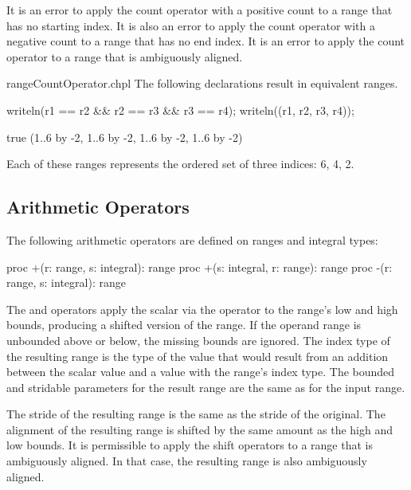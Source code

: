 It is an error to apply the count operator with a positive count to a range that
has no starting index.  It is also an error to apply the count operator
with a negative count to a range that has no end index.
It is an error to apply the count operator to a range that is ambiguously aligned.

\begin{chapelexample}{rangeCountOperator.chpl}
The following declarations result in equivalent ranges.
\begin{chapelpost}
writeln(r1 == r2 \&\& r2 == r3 \&\& r3 == r4);
writeln((r1, r2, r3, r4));
\end{chapelpost}
\begin{chapeloutput}
true
(1..6 by -2, 1..6 by -2, 1..6 by -2, 1..6 by -2)
\end{chapeloutput}
Each of these ranges represents the ordered set of three indices: 6, 4, 2.
\end{chapelexample}

\subsection{Arithmetic Operators}
\label{Range_Arithmetic}

The following arithmetic operators are defined on ranges and integral
types:

\begin{chapel}
proc +(r: range, s: integral): range
proc +(s: integral, r: range): range
proc -(r: range, s: integral): range
\end{chapel}

The \chpl{+} and \chpl{-} operators apply the scalar via the operator
to the range's low and high bounds, producing a shifted version of the
range.  If the operand range is unbounded above or below, the missing bounds
are ignored.
The index type of the resulting range is the type of the value
that would result from an addition between the scalar value and a value
with the range's index type.  The bounded and stridable parameters for
the result range are the same as for the input range.

The stride of the resulting range is the same as the stride of the
original. The alignment of the resulting range is shifted by the same amount as
the high and low bounds.  It is permissible to apply the shift operators to a
range that is ambiguously aligned.  In that case, the resulting range is also
ambiguously aligned.

